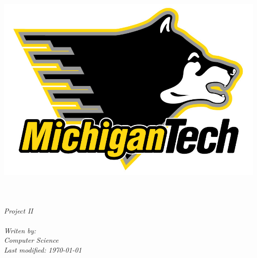 \documentclass[11pt, a4paper, oneside]{Thesis}
\begin{document}
\begin{titlepage}
\begin{center}

\includegraphics{logo.jpg}\\[1cm] %
\textsc{\LARGE \univname}\\[1.5cm] %
\HRule \\[1.0cm] %
{\huge \bfseries \ttitle}\\[0.4cm] %

\huge \textit {Project II}\\[0.1cm] %
\HRule \\[1.5cm] %

\small \textit{Writen by: \authornames}\\[0.5cm] %
\textit{Computer Science}\\[2cm] %
\textit{\large Last modified: \today}\\[4cm] %

 
\vfill
\end{center}

\end{titlepage}


\clearpage %


\pagestyle{empty} %
\end{document}
